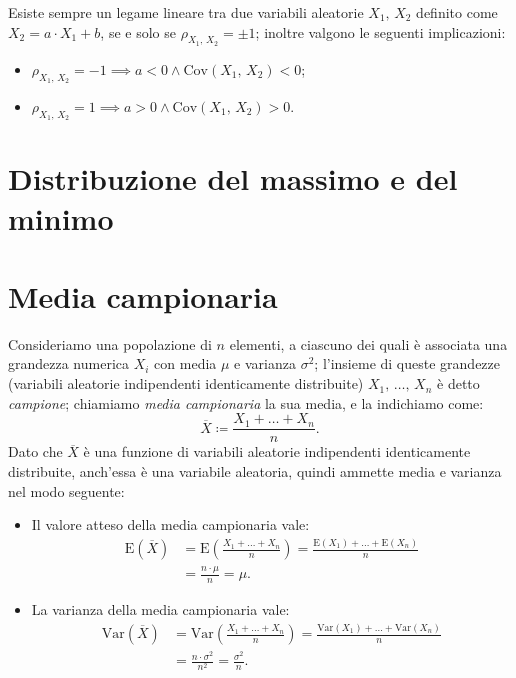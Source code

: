         \begin{note}
            Esiste sempre un legame lineare tra due variabili aleatorie $X_1,\,X_2$ definito come $X_2 = a\cdot X_1 + b$, se e solo se $\rho_{X_1,\,X_2}=\pm 1$; inoltre valgono le seguenti implicazioni:
            \begin{itemize}
                \item $\rho_{X_1,\,X_2} = -1 \implies a<0 \land \text{Cov}(X_1,\,X_2)<0$;
                \item $\rho_{X_1,\,X_2} = 1 \implies a>0 \land \text{Cov}(X_1,\,X_2)>0$.
            \end{itemize}
        \end{note}
    \section{Distribuzione del massimo e del minimo}
    \section{Media campionaria}
        \begin{defn}
            Consideriamo una popolazione di $n$ elementi, a ciascuno dei quali è associata una grandezza numerica $X_i$ con media $\mu$ e varianza $\sigma^2$; l'insieme di queste grandezze (variabili aleatorie indipendenti identicamente distribuite) $X_1,\, \ldots,\, X_{n}$ è detto \textit{campione}; chiamiamo \textit{media campionaria} la sua media, e la indichiamo come: \[
            \overline{X} \coloneqq \frac{X_1 + \ldots + X_{n}}{n}
            .\] Dato che $\overline{X}$ è una funzione di variabili aleatorie indipendenti identicamente distribuite, anch'essa è una variabile aleatoria, quindi ammette media e varianza nel modo seguente:
            \begin{itemize}
                \item Il valore atteso della media campionaria vale:
                    \begin{align*}
                        \text{E}(\overline{X}) &= \text{E}\left(\frac{X_1 + \ldots + X_n}{n}\right)
                        = \frac{\text{E}(X_1) + \ldots + \text{E}(X_n)}{n} \\
                        &= \frac{n \cdot \mu}{n} = \mu
                    .\end{align*}
                \item La varianza della media campionaria vale:
                    \begin{align*}
                        \text{Var}(\overline{X}) &= \text{Var}\left(\frac{X_1 + \ldots + X_n}{n}\right)
                        = \frac{\text{Var}(X_1) + \ldots + \text{Var}(X_n)}{n} \\
                        &= \frac{n\cdot \sigma^2}{n^2} = \frac{\sigma^2}{n}
                    .\end{align*}
            \end{itemize}
        \end{defn}
